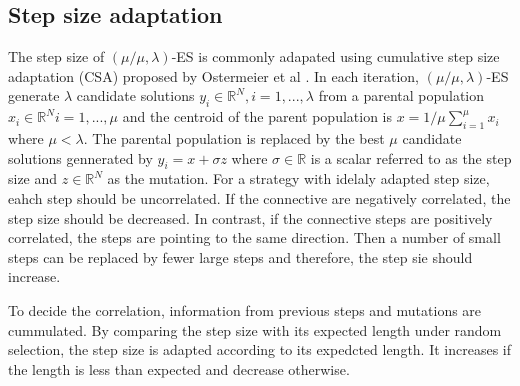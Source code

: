  
\subsection{Step size adaptation}

The step size of $(\mu/\mu,\lambda)$-ES is commonly adapated using cumulative step size adaptation (CSA) proposed by Ostermeier et al \cite{Ostermeier:1994:DAS:1326675.1326679}. In each iteration, $(\mu/\mu,\lambda)$-ES generate $\lambda$ candidate solutions $y_i \in \mathbb{R}^N,i=1,...,\lambda$ from a parental population $x_i \in \mathbb{R}^N i=1,...,\mu$ and the centroid of the parent population is $x = 1/\mu \sum_{i=1}^\mu x_i$ where $\mu < \lambda$. The parental population is replaced by the best $\mu$ candidate solutions gennerated by $y_i = x + \sigma z$ where $\sigma \in \mathbb{R}$ is a scalar referred to as the step size and $z \in \mathbb{R}^N$ as the mutation. For a strategy with idelaly adapted step size, eahch step should be uncorrelated. If the connective are negatively correlated, the step size should be decreased. In contrast, if the connective steps are positively correlated, the steps are pointing to the same direction. Then a number of small steps can be replaced by fewer large steps and therefore, the step sie should increase. 

To decide the correlation, information from previous steps and mutations are cummulated. By comparing the step size with its expected length under random selection, the step size is adapted according to its expedcted length. It increases if the length is less than expected and decrease otherwise. 

